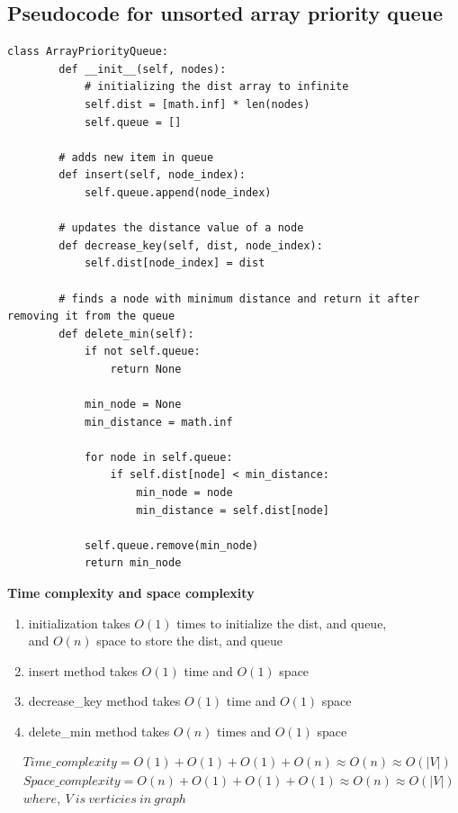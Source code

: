 \documentclass[12pt]{article}
\begin{document}
\subsection{Pseudocode for unsorted array priority queue}
\begin{lstlisting}[style=mystyle]
    class ArrayPriorityQueue:
        def __init__(self, nodes):
            # initializing the dist array to infinite
            self.dist = [math.inf] * len(nodes)
            self.queue = []

        # adds new item in queue
        def insert(self, node_index):
            self.queue.append(node_index)
    
        # updates the distance value of a node
        def decrease_key(self, dist, node_index):
            self.dist[node_index] = dist
        
        # finds a node with minimum distance and return it after removing it from the queue
        def delete_min(self):
            if not self.queue:
                return None
    
            min_node = None
            min_distance = math.inf
    
            for node in self.queue:
                if self.dist[node] < min_distance:
                    min_node = node
                    min_distance = self.dist[node]
    
            self.queue.remove(min_node)
            return min_node
    \end{lstlisting}

\newpage

\noindent\textbf{Time complexity and space complexity} \\
\begin{enumerate}
    \item initialization takes $O(1)$ times to initialize the dist, and queue,\\
     and $O(n)$ space to store the dist, and queue
    \item insert method takes $O(1)$ time and $O(1)$ space
    \item decrease\_key method takes $O(1)$ time and $O(1)$ space 
    \item delete\_min method takes $O(n)$ times and $O(1)$ space 
\end{enumerate}
\begin{equation} %
\begin{split}
    &Time\_complexity = O(1) + O(1) + O(1) + O(n) \approx O(n) \approx O(|V|) \\
    &Space\_complexity = O(n) + O(1) + O(1) + O(1) \approx O(n) \approx O(|V|) \\
    &where,\ V \ is \ verticies \ in \ graph
\end{split}
\end{equation}
\end{document}
